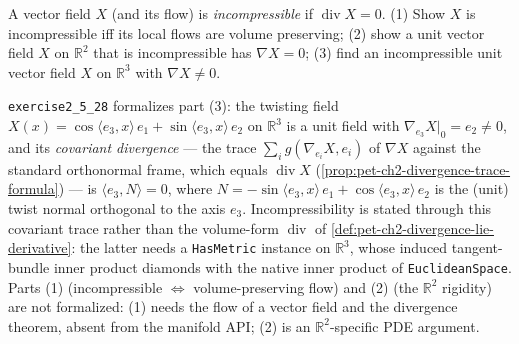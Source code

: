 \begin{remark}
  \label{rem:pet-ch2-ex-28}
  \leanok
  A vector field $X$ (and its flow) is \emph{incompressible} if
  $\operatorname{div}X=0$. (1) Show $X$ is incompressible iff its local flows
  are volume preserving; (2) show a unit vector field $X$ on $\mathbb{R}^2$ that is
  incompressible has $\nabla X=0$; (3) find an incompressible unit vector
  field $X$ on $\mathbb{R}^3$ with $\nabla X\ne0$.

  \texttt{exercise2\_5\_28} formalizes part (3): the twisting field
  $X(x)=\cos\langle e_3,x\rangle\,e_1+\sin\langle e_3,x\rangle\,e_2$ on
  $\mathbb{R}^3$ is a unit field with $\nabla_{e_3}X|_0=e_2\ne0$, and its
  \emph{covariant divergence} — the trace $\sum_i g(\nabla_{e_i}X,e_i)$ of
  $\nabla X$ against the standard orthonormal frame, which equals
  $\operatorname{div}X$ (\cref{prop:pet-ch2-divergence-trace-formula}) — is
  $\langle e_3,N\rangle=0$, where $N=-\sin\langle e_3,x\rangle\,e_1+
  \cos\langle e_3,x\rangle\,e_2$ is the (unit) twist normal orthogonal to the
  axis $e_3$. Incompressibility is stated through this covariant trace rather
  than the volume-form $\operatorname{div}$ of
  \cref{def:pet-ch2-divergence-lie-derivative}: the latter needs a
  \texttt{HasMetric} instance on $\mathbb{R}^3$, whose induced tangent-bundle
  inner product diamonds with the native inner product of \texttt{EuclideanSpace}.
  Parts (1) (incompressible $\Leftrightarrow$ volume-preserving flow) and (2)
  (the $\mathbb{R}^2$ rigidity) are not formalized: (1) needs the flow of a
  vector field and the divergence theorem, absent from the manifold API; (2) is
  an $\mathbb{R}^2$-specific PDE argument.
\end{remark}

